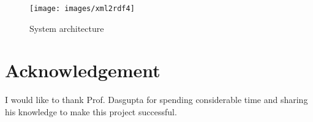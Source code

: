 \documentclass[journal]{IEEEtran}
\begin{document}
\begin{figure*}[h]
    \centering
    \texttt{[image: images/xml2rdf4]}
    \caption{System architecture}
    \label{fig:xml2rdf4}
\end{figure*}


\section*{Acknowledgement}
I would like to thank Prof. Dasgupta for spending considerable time and sharing his knowledge to make this project successful.

%


\end{document}
